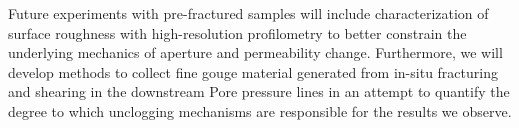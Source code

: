 Future experiments with pre-fractured samples will include characterization of surface roughness with high-resolution profilometry to better constrain the underlying mechanics of aperture and permeability change. Furthermore, we will develop methods to collect fine gouge material generated from in-situ fracturing and shearing in the downstream Pore pressure lines in an attempt to quantify the degree to which unclogging mechanisms are responsible for the results we observe. 



